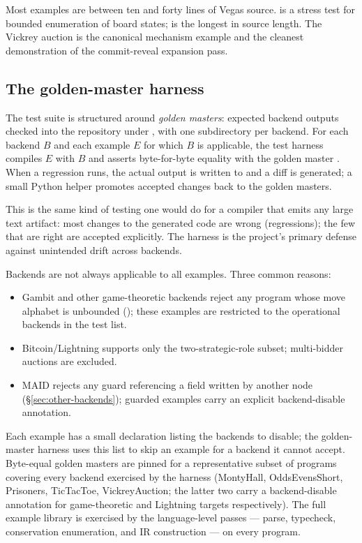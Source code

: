 Most examples are between ten and forty lines of Vegas source.
 is a stress test for bounded enumeration of
board states;  is the longest in source
length.  The Vickrey auction is the canonical mechanism example
and the cleanest demonstration of the commit-reveal expansion
pass.

\subsection{The golden-master harness}

The test suite is structured around \emph{golden masters}:
expected backend outputs checked into the repository under
, with one subdirectory
per backend.  For each backend $B$ and each example $E$ for
which $B$ is applicable, the test harness compiles $E$ with $B$
and asserts byte-for-byte equality with the golden master
.  When a regression
runs, the actual output is written to 
and a diff is generated; a small Python helper
 promotes accepted changes back to
the golden masters.

This is the same kind of testing one would do for a compiler
that emits any large text artifact: most changes to the
generated code are wrong (regressions); the few that are right
are accepted explicitly.  The harness is the project's primary
defense against unintended drift across backends.

Backends are not always applicable to all examples.  Three
common reasons:

\begin{itemize}\itemsep1pt
\item Gambit and other game-theoretic backends reject any program
  whose move alphabet is unbounded (); these examples
  are restricted to the operational backends in the test list.
\item Bitcoin/Lightning supports only the two-strategic-role
  subset; multi-bidder auctions are excluded.
\item MAID rejects any guard referencing a field written by
  another node (\S\ref{sec:other-backends}); guarded examples
  carry an explicit backend-disable annotation.
\end{itemize}

Each example has a small declaration listing the backends to
disable; the golden-master harness uses this list to skip an
example for a backend it cannot accept.  Byte-equal golden
masters are pinned for a representative subset of programs
covering every backend exercised by the harness (MontyHall,
OddsEvensShort, Prisoners, TicTacToe, VickreyAuction; the latter
two carry a backend-disable annotation for game-theoretic and
Lightning targets respectively).  The full example library is
exercised by the language-level passes --- parse, typecheck,
conservation enumeration, and IR construction --- on every
program.

